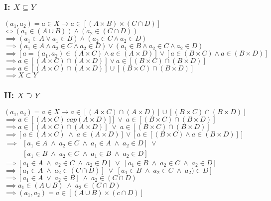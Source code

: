 \documentclass[10pt,a4paper]{article}
\newcommand\sland{\;\land\;}
\newcommand\slor{\;\lor\;}
\begin{document}
\subsubsection*{I:  $X \subseteq Y$}

$(a_1 , a_2) = a \in X \rightarrow a \in [(A \times B) \times (C \cap D)]$ \\
$\iff (a_1 \in (A \cup B)) \land (a_2 \in (C \cap D))$ \\
$\implies (a_1 \in A \lor a_1 \in B) \land (a_2 \in C \land a_2 \in D)$ \\
$\implies (a_1 \in A \land a_2 \in C \land a_2 \in D) \lor (a_1 \in B \land a_2 \in C \land a_2 \in D)$ \\
$\implies [a=(a_1,a_2) \in (A \times C) \land a \in (A \times D)] \lor [a \in (B \times C) \land a \in (B \times D)]$ \\
$\implies a \in [(A \times C) \cap (A \times D)] \lor a \in [(B \times C)\cap(B \times D)]$ \\
$\implies a \in [(A \times C) \cap (A \times D)] \cup [(B \times C) \cap (B \times D)]$ \\
$\implies X \subset Y$

\subsubsection*{II:  $X \supseteq Y$}

$(a_1,a_2) = a \in X \rightarrow a \in[(A \times C) \cap (A \times D)] \cup [(B \times C)\cap(B \times D)]$ \\
$\implies a \in [(A \times C) \ cap (A \times D)]] \;\lor\; a \in [(B \times C)\cap(B \times D)]$ \\
$\implies a \in [(A \times C) \cap (A \times D)] \;\lor\; a \in[(B \times C)\cap(B \times D)]$ \\
$\implies [a \in (A \times C) \;\land\; a \in (A \times D)]\lor[a \in[(B \times C) \land a \in(B\times D)]]$\\

$\begin{aligned}
	 \implies &[a_1 \in A \sland a_2 \in C \sland a_1 \in A \sland a_2 \in D] \slor \\
				&[a_1 \in B \sland a_2 \in C \sland a_1 \in B \sland a_2 \in D] 
\end{aligned}$ \\
$\implies [a_1 \in A \sland a_2 \in C \sland a_2 \in D] \slor [a_1 \in B \sland a_2 \in C \sland a_2 \in D]$\\
$\implies [a_1 \in A \sland a_2\in(C \cap D)]\slor[a_1\in B \sland a_2 \in C \sland a_2) \in D]$ \\
$\implies [a_1 \in A \slor a_2 \in B] \sland a_2 \in (C \cap D)$ \\
$\implies a_1 \in (A\cup B) \sland a_2 \in (C\cap D)$ \\
$\implies (a_1, a_2)=a \in [(A \cup B )\times (c \cap D)]$ \\
\end{document}

